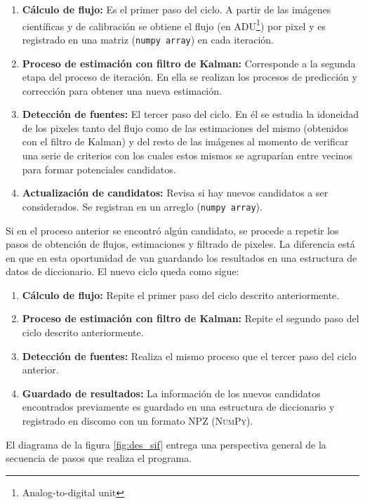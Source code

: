 \begin{enumerate}
\item \textbf{C\'alculo de flujo:} Es el primer paso del ciclo. A partir de las im\'agenes cient\'ificas y de calibraci\'on se obtiene el flujo (en ADU\footnote{Analog-to-digital unit}) por pixel y es registrado en una matriz (\texttt{numpy array}) en cada iteraci\'on. 
\item \textbf{Proceso de estimaci\'on con filtro de Kalman:} Corresponde a la segunda etapa del proceso de iteraci\'on. En ella se realizan los procesos de predicci\'on y correcci\'on para obtener una nueva estimaci\'on. 
\item \textbf{Detecci\'on de fuentes:} El tercer paso del ciclo. En \'el se estudia la idoneidad de los pixeles tanto del flujo como de las estimaciones del mismo (obtenidos con el filtro de Kalman) y del resto de las im\'agenes al momento de verificar una serie de criterios con los cuales estos mismos se agrupar\'ian  entre vecinos para formar potenciales candidatos.  
\item \textbf{Actualizaci\'on de candidatos:} Revisa si hay nuevos candidatos a ser considerados. Se registran en un arreglo (\texttt{numpy array}).
\end{enumerate}

Si en el proceso anterior se encontr\'o alg\'un candidato, se procede a repetir los pasos de obtenci\'on de flujos, estimaciones y filtrado de pixeles. La diferencia est\'a en que en esta oportunidad de van guardando los resultados en una estructura de datos de diccionario. El nuevo ciclo queda como sigue:

\begin{enumerate}
\item \textbf{C\'alculo de flujo:} Repite el primer paso del ciclo descrito anteriormente.
\item \textbf{Proceso de estimaci\'on con filtro de Kalman:} Repite el segundo paso del ciclo descrito anteriormente.
\item \textbf{Detecci\'on de fuentes:} Realiza el mismo proceso que el tercer paso del ciclo anterior.
\item \textbf{Guardado de resultados:} La informaci\'on de los nuevos candidatos encontrados previamente es guardado en una estructura de diccionario y registrado en discomo con un formato NPZ (\textsc{NumPy}).
\end{enumerate}


El diagrama de la figura \ref{fig:des_sif} entrega una perspectiva general de la secuencia de pasos que realiza el programa.
\bigskip

